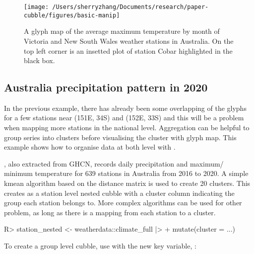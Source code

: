 \documentclass[
]{jss}
\begin{document}
\begin{CodeChunk}
\begin{figure}

{\centering \texttt{[image: /Users/sherryzhang/Documents/research/paper-cubble/figures/basic-manip]} 

}

\caption[A glyph map of the average maximum temperature by month of Victoria and New South Wales weather stations in Australia]{A glyph map of the average maximum temperature by month of Victoria and New South Wales weather stations in Australia. On the top left corner is an insetted plot of station Cobar highlighted in the black box.}\label{fig:basic-manip}
\end{figure}
\end{CodeChunk}

\hypertarget{australia-precipitation-pattern-in-2020}{%
\subsection{Australia precipitation pattern in
2020}\label{australia-precipitation-pattern-in-2020}}

In the previous example, there has already been some overlapping of the
glyphs for a few stations near (151E, 34S) and (152E, 33S) and this will
be a problem when mapping more stations in the national level.
Aggregation can be helpful to group series into clusters before
visualising the cluster with glyph map. This example shows how to
organise data at both level with .

, also extracted from GHCN, records
daily precipitation and maximum/ minimum temperature for 639 stations in
Australia from 2016 to 2020. A simple kmean algorithm based on the
distance matrix is used to create 20 clusters. This creates
 as a station level nested cubble with a cluster
column indicating the group each station belongs to. More complex
algorithms can be used for other problem, as long as there is a mapping
from each station to a cluster.

\begin{CodeChunk}
\begin{CodeInput}
R> station_nested <- weatherdata::climate_full |> 
+   mutate(cluster = ...)
\end{CodeInput}
\end{CodeChunk}

To create a group level cubble, use  with the new key
variable, :
\end{document}
